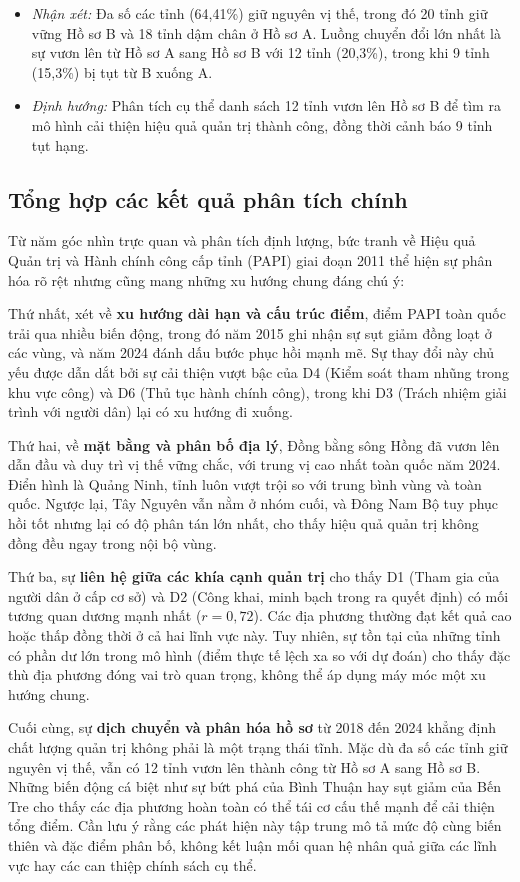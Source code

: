 \begin{itemize}
    \item \textit{Nhận xét:} Đa số các tỉnh (64,41\%) giữ nguyên vị thế, trong đó 20 tỉnh giữ vững Hồ sơ B và 18 tỉnh dậm chân ở Hồ sơ A. Luồng chuyển đổi lớn nhất là sự vươn lên từ Hồ sơ A sang Hồ sơ B với 12 tỉnh (20,3\%), trong khi 9 tỉnh (15,3\%) bị tụt từ B xuống A.
    \item \textit{Định hướng:} Phân tích cụ thể danh sách 12 tỉnh vươn lên Hồ sơ B để tìm ra mô hình cải thiện hiệu quả quản trị thành công, đồng thời cảnh báo 9 tỉnh tụt hạng.
\end{itemize}

\subsection{Tổng hợp các kết quả phân tích chính}

Từ năm góc nhìn trực quan và phân tích định lượng, bức tranh về Hiệu quả Quản trị và Hành chính công cấp tỉnh (PAPI) giai đoạn 2011 thể hiện sự phân hóa rõ rệt nhưng cũng mang những xu hướng chung đáng chú ý:

Thứ nhất, xét về \textbf{xu hướng dài hạn và cấu trúc điểm}, điểm PAPI toàn quốc trải qua nhiều biến động, trong đó năm 2015 ghi nhận sự sụt giảm đồng loạt ở các vùng, và năm 2024 đánh dấu bước phục hồi mạnh mẽ. Sự thay đổi này chủ yếu được dẫn dắt bởi sự cải thiện vượt bậc của D4 (Kiểm soát tham nhũng trong khu vực công) và D6 (Thủ tục hành chính công), trong khi D3 (Trách nhiệm giải trình với người dân) lại có xu hướng đi xuống.

Thứ hai, về \textbf{mặt bằng và phân bố địa lý}, Đồng bằng sông Hồng đã vươn lên dẫn đầu và duy trì vị thế vững chắc, với trung vị cao nhất toàn quốc năm 2024. Điển hình là Quảng Ninh, tỉnh luôn vượt trội so với trung bình vùng và toàn quốc. Ngược lại, Tây Nguyên vẫn nằm ở nhóm cuối, và Đông Nam Bộ tuy phục hồi tốt nhưng lại có độ phân tán lớn nhất, cho thấy hiệu quả quản trị không đồng đều ngay trong nội bộ vùng.

Thứ ba, sự \textbf{liên hệ giữa các khía cạnh quản trị} cho thấy D1 (Tham gia của người dân ở cấp cơ sở) và D2 (Công khai, minh bạch trong ra quyết định) có mối tương quan dương mạnh nhất ($r=0{,}72$). Các địa phương thường đạt kết quả cao hoặc thấp đồng thời ở cả hai lĩnh vực này. Tuy nhiên, sự tồn tại của những tỉnh có phần dư lớn trong mô hình (điểm thực tế lệch xa so với dự đoán) cho thấy đặc thù địa phương đóng vai trò quan trọng, không thể áp dụng máy móc một xu hướng chung.

Cuối cùng, sự \textbf{dịch chuyển và phân hóa hồ sơ} từ 2018 đến 2024 khẳng định chất lượng quản trị không phải là một trạng thái tĩnh. Mặc dù đa số các tỉnh giữ nguyên vị thế, vẫn có 12 tỉnh vươn lên thành công từ Hồ sơ A sang Hồ sơ B. Những biến động cá biệt như sự bứt phá của Bình Thuận hay sụt giảm của Bến Tre cho thấy các địa phương hoàn toàn có thể tái cơ cấu thế mạnh để cải thiện tổng điểm. Cần lưu ý rằng các phát hiện này tập trung mô tả mức độ cùng biến thiên và đặc điểm phân bố, không kết luận mối quan hệ nhân quả giữa các lĩnh vực hay các can thiệp chính sách cụ thể.
